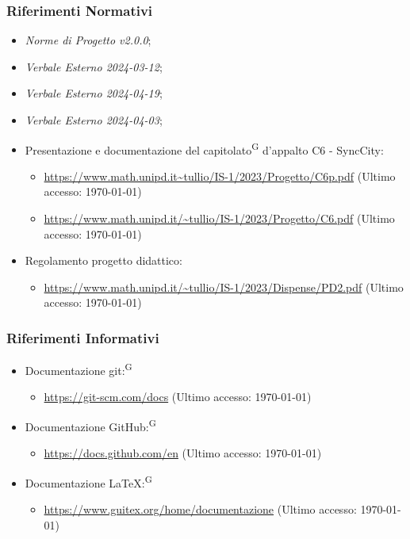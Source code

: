 \documentclass[8pt]{article}
\newcommand{\glossterm}[1]{#1\textsuperscript{G}} %
\begin{document}
\subsubsection{Riferimenti Normativi}
\begin{itemize}
	\setlength\itemsep{0em}
	\item \textit{Norme di Progetto v2.0.0};
    \item \textit{Verbale Esterno 2024-03-12};
	\item \textit{Verbale Esterno 2024-04-19};
	\item \textit{Verbale Esterno 2024-04-03};
  \item Presentazione e documentazione del \glossterm{capitolato} d'appalto C6 - SyncCity:
	\begin{itemize}
		\item \href{https://www.math.unipd.it/~tullio/IS-1/2023/Progetto/C6p.pdf}{https://www.math.unipd.it\textasciitilde{}tullio/IS-1/2023/Progetto/C6p.pdf} (Ultimo accesso: \today)
		\item \href{https://www.math.unipd.it/~tullio/IS-1/2023/Progetto/C6.pdf}{https://www.math.unipd.it/\textasciitilde{}tullio/IS-1/2023/Progetto/C6.pdf} (Ultimo accesso: \today)
  \end{itemize}
  \item Regolamento progetto didattico:
      \begin{itemize}
          \item \href{https://www.math.unipd.it/~tullio/IS-1/2023/Dispense/PD2.pdf}{https://www.math.unipd.it/\textasciitilde{}tullio/IS-1/2023/Dispense/PD2.pdf} (Ultimo accesso: \today)
    \end{itemize}
\end{itemize}
\subsubsection{Riferimenti Informativi}
\begin{itemize}
    \setlength\itemsep{0em}
    \item Documentazione \glossterm{git:} 
      \begin{itemize}
          \item \href{https://git-scm.com/docs}{https://git-scm.com/docs} (Ultimo accesso: \today)
      \end{itemize}
    \item Documentazione \glossterm{GitHub:} 
      \begin{itemize}
          \item \href{https://docs.github.com/en}{https://docs.github.com/en} (Ultimo accesso: \today)
      \end{itemize}
    \item Documentazione \glossterm{\LaTeX:} 
      \begin{itemize}
          \item \href{https://www.guitex.org/home/documentazione}{https://www.guitex.org/home/documentazione} (Ultimo accesso: \today)
      \end{itemize}
\end{itemize}
\newpage
\end{document}
